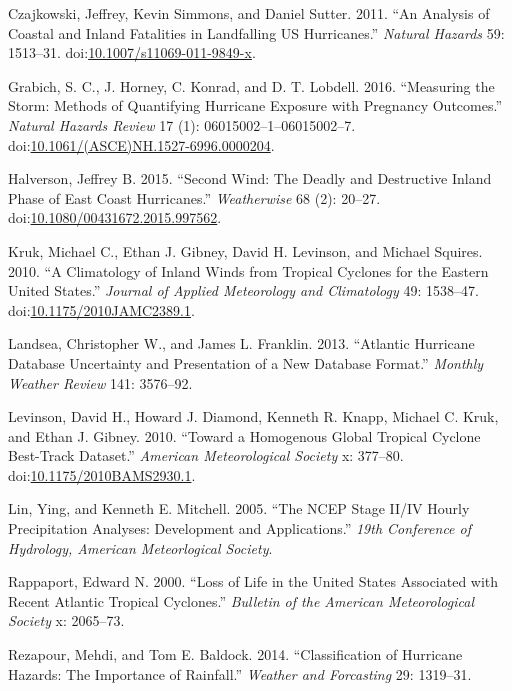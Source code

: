 \documentclass[]{elsarticle} %
\begin{document}
\hypertarget{ref-Czajkowski2011}{}
Czajkowski, Jeffrey, Kevin Simmons, and Daniel Sutter. 2011. ``An
Analysis of Coastal and Inland Fatalities in Landfalling US
Hurricanes.'' \emph{Natural Hazards} 59: 1513--31.
doi:\href{https://doi.org/10.1007/s11069-011-9849-x}{10.1007/s11069-011-9849-x}.

\hypertarget{ref-Grabich2016}{}
Grabich, S. C., J. Horney, C. Konrad, and D. T. Lobdell. 2016.
``Measuring the Storm: Methods of Quantifying Hurricane Exposure with
Pregnancy Outcomes.'' \emph{Natural Hazards Review} 17 (1):
06015002--1--06015002--7.
doi:\href{https://doi.org/10.1061/(ASCE)NH.1527-6996.0000204}{10.1061/(ASCE)NH.1527-6996.0000204}.

\hypertarget{ref-Halverson2015}{}
Halverson, Jeffrey B. 2015. ``Second Wind: The Deadly and Destructive
Inland Phase of East Coast Hurricanes.'' \emph{Weatherwise} 68 (2):
20--27.
doi:\href{https://doi.org/10.1080/00431672.2015.997562}{10.1080/00431672.2015.997562}.

\hypertarget{ref-Kruk2010}{}
Kruk, Michael C., Ethan J. Gibney, David H. Levinson, and Michael
Squires. 2010. ``A Climatology of Inland Winds from Tropical Cyclones
for the Eastern United States.'' \emph{Journal of Applied Meteorology
and Climatology} 49: 1538--47.
doi:\href{https://doi.org/10.1175/2010JAMC2389.1}{10.1175/2010JAMC2389.1}.

\hypertarget{ref-Landsea2013}{}
Landsea, Christopher W., and James L. Franklin. 2013. ``Atlantic
Hurricane Database Uncertainty and Presentation of a New Database
Format.'' \emph{Monthly Weather Review} 141: 3576--92.

\hypertarget{ref-Levinson2010}{}
Levinson, David H., Howard J. Diamond, Kenneth R. Knapp, Michael C.
Kruk, and Ethan J. Gibney. 2010. ``Toward a Homogenous Global Tropical
Cyclone Best-Track Dataset.'' \emph{American Meteorological Society} x:
377--80.
doi:\href{https://doi.org/10.1175/2010BAMS2930.1}{10.1175/2010BAMS2930.1}.

\hypertarget{ref-Lin2005}{}
Lin, Ying, and Kenneth E. Mitchell. 2005. ``The NCEP Stage II/IV Hourly
Precipitation Analyses: Development and Applications.'' \emph{19th
Conference of Hydrology, American Meteorlogical Society}.

\hypertarget{ref-Rappaport2000}{}
Rappaport, Edward N. 2000. ``Loss of Life in the United States
Associated with Recent Atlantic Tropical Cyclones.'' \emph{Bulletin of
the American Meteorological Society} x: 2065--73.

\hypertarget{ref-Rezapour2014}{}
Rezapour, Mehdi, and Tom E. Baldock. 2014. ``Classification of Hurricane
Hazards: The Importance of Rainfall.'' \emph{Weather and Forcasting} 29:
1319--31.
\end{document}
